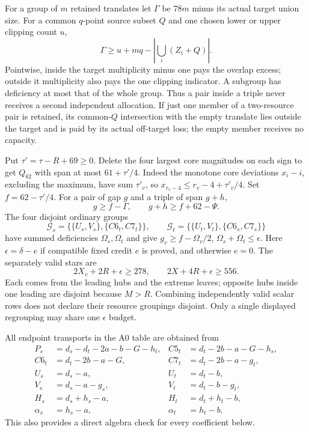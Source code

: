 \documentclass[11pt,letterpaper]{article}
\theoremstyle{definition}\newtheorem{definition}[theorem]{Definition}
\begin{document}
For a group of $m$ retained translates let $\Gamma$ be $78m$ minus
its actual target union size. For a common $q$-point source subset $Q$
and one chosen lower or upper clipping count $u$,
\begin{equation}\label{eq:z5-joint}
 \Gamma\ge u+mq-\left|\bigcup_i(Z_i+Q)\right|.
\end{equation}
Pointwise, inside the target multiplicity minus one pays the overlap
excess; outside it multiplicity also pays the one clipping indicator.
A subgroup has deficiency at most that of the whole group. Thus a pair
inside a triple never receives a second independent allocation.
If just one member of a two-resource pair is retained, its common-$Q$
intersection with the empty translate lies outside the target and is
paid by its actual off-target loss; the empty member receives no capacity.

Put $\tau'=\tau-R+69\ge0$. Delete the four largest core magnitudes on
each sign to get $Q_{62}$ with span at most $61+\tau'/4$.
Indeed the monotone core deviations $x_i-i$, excluding the maximum,
have sum $\tau'_v$, so $x_{r_v-4}\le r_v-4+\tau'_v/4$.
Set $f=62-\tau'/4$. For a pair of gap $g$ and a triple of span $g+h$,
\begin{equation}\label{eq:z5-pairs}
 g\ge f-\Gamma,\qquad g+h\ge f+62-\Psi.
\end{equation}
The four disjoint ordinary groups
\[
 \mathcal G_s=\{\{U_s,V_s\},\{C6_t,C7_t\}\},\qquad
 \mathcal G_t=\{\{U_t,V_t\},\{C6_s,C7_s\}\}
\]
have summed deficiencies $\Omega_s,\Omega_t$ and give
$g_v\ge f-\Omega_v/2$, $\Omega_s+\Omega_t\le\epsilon$.
Here $\epsilon=\delta-e$ if compatible fixed credit $e$ is proved,
and otherwise $e=0$. The separately valid stars are
\begin{equation}\label{eq:z5-stars}
 2X_v+2R+\epsilon\ge278,\qquad
 2X+4R+\epsilon\ge556.
\end{equation}
Each comes from the leading hubs and the extreme leaves; opposite hubs
inside one leading are disjoint because $M>R$. Combining independently
valid scalar rows does not declare their resource groupings disjoint.
Only a single displayed regrouping may share one $\epsilon$ budget.

All endpoint transports in the A0 table are obtained from
\begin{equation}\label{eq:z5-identities}
\begin{aligned}
 P_s&=d_s-d_t-2a-b-G-h_t,& C5_t&=d_t-2b-a-G-h_s,\\
 C6_t&=d_t-2b-a-G,& C7_t&=d_t-2b-a-g_t,\\
 U_s&=d_s-a,&U_t&=d_t-b,\\
 V_s&=d_s-a-g_s,&V_t&=d_t-b-g_t,\\
 H_s&=d_s+h_s-a,&H_t&=d_t+h_t-b,\\
 \alpha_s&=h_s-a,&\alpha_t&=h_t-b.
\end{aligned}
\end{equation}
This also provides a direct algebra check for every coefficient below.
\end{document}
